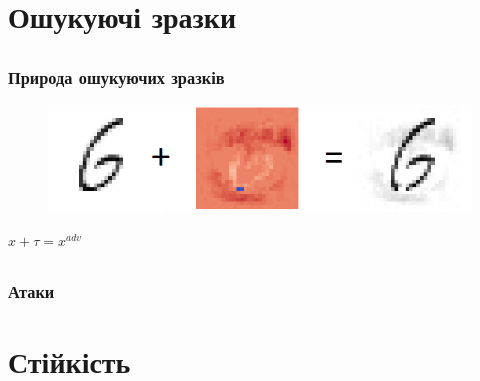 \documentclass{beamer}
\numberwithin{equation}{section}
\begin{document}
	\section{Ошукуючі зразки}
	\subsection{}
	\begin{frame}
		\frametitle{Природа ошукуючих зразків}
		\begin{figure}[h]
			\centering
			\includegraphics[width=.8\textwidth]{../images/six.png}
			
		\end{figure}
	\vspace{1cm}
		\begin{center}
			\LARGE
			$x+\tau=x^{adv}$
		\end{center}
	\end{frame}
	
	\subsection{}
	\begin{frame}
		\frametitle{Атаки}
		
	\end{frame}


	\section{Стійкість}
\end{document}
